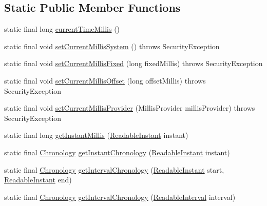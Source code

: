 \subsection*{Static Public Member Functions}
\begin{DoxyCompactItemize}
\item 
static final long \hyperlink{classorg_1_1joda_1_1time_1_1_date_time_utils_a4016fe4b94ce75b30b870f1b776a9174}{current\-Time\-Millis} ()
\item 
static final void \hyperlink{classorg_1_1joda_1_1time_1_1_date_time_utils_a167dfe850fd4aaaecf5ad738cb2f90e2}{set\-Current\-Millis\-System} ()  throws Security\-Exception 
\item 
static final void \hyperlink{classorg_1_1joda_1_1time_1_1_date_time_utils_a7dc81b2c5d94298e0ee7d885a7646ad4}{set\-Current\-Millis\-Fixed} (long fixed\-Millis)  throws Security\-Exception 
\item 
static final void \hyperlink{classorg_1_1joda_1_1time_1_1_date_time_utils_a5d7bfd3a3392810b4610544917a79e88}{set\-Current\-Millis\-Offset} (long offset\-Millis)  throws Security\-Exception 
\item 
static final void \hyperlink{classorg_1_1joda_1_1time_1_1_date_time_utils_a17c912e68ae2a5030675b45cabc6c064}{set\-Current\-Millis\-Provider} (Millis\-Provider millis\-Provider)  throws Security\-Exception 
\item 
static final long \hyperlink{classorg_1_1joda_1_1time_1_1_date_time_utils_a7989fa799cf57cd39983a44e21b0f6db}{get\-Instant\-Millis} (\hyperlink{interfaceorg_1_1joda_1_1time_1_1_readable_instant}{Readable\-Instant} instant)
\item 
static final \hyperlink{classorg_1_1joda_1_1time_1_1_chronology}{Chronology} \hyperlink{classorg_1_1joda_1_1time_1_1_date_time_utils_a057238c940eac6e9ccf5148b8c95a223}{get\-Instant\-Chronology} (\hyperlink{interfaceorg_1_1joda_1_1time_1_1_readable_instant}{Readable\-Instant} instant)
\item 
static final \hyperlink{classorg_1_1joda_1_1time_1_1_chronology}{Chronology} \hyperlink{classorg_1_1joda_1_1time_1_1_date_time_utils_a998d75818dc66bb49bb88401e0232076}{get\-Interval\-Chronology} (\hyperlink{interfaceorg_1_1joda_1_1time_1_1_readable_instant}{Readable\-Instant} start, \hyperlink{interfaceorg_1_1joda_1_1time_1_1_readable_instant}{Readable\-Instant} end)
\item 
static final \hyperlink{classorg_1_1joda_1_1time_1_1_chronology}{Chronology} \hyperlink{classorg_1_1joda_1_1time_1_1_date_time_utils_a7bdd07737d6d615c94485d26772dd8fc}{get\-Interval\-Chronology} (\hyperlink{interfaceorg_1_1joda_1_1time_1_1_readable_interval}{Readable\-Interval} interval)

\end{DoxyCompactItemize}
